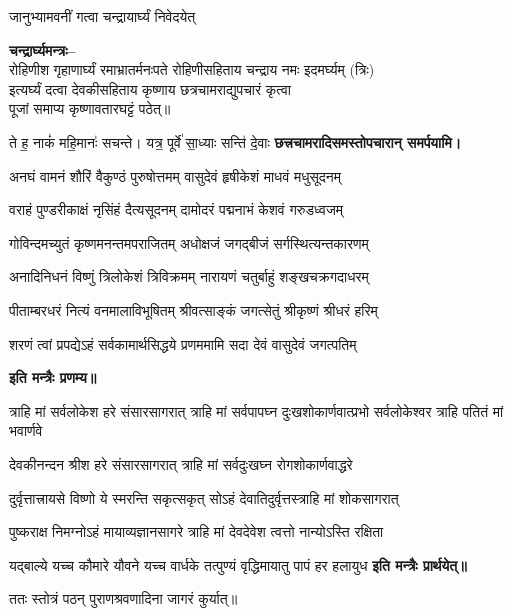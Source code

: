 \begin{center}
{जानुभ्यामवनीं गत्वा चन्द्रायार्घ्यं निवेदयेत्}

\textbf{चन्द्रार्घ्यमन्त्रः–}\\
{रोहिणीश गृहाणार्घ्यं रमाभ्रातर्मनःपते}
रोहिणीसहिताय चन्द्राय नमः इदमर्घ्यम् (त्रिः)\\

इत्यर्घ्यं दत्वा देवकीसहिताय कृष्णाय छत्रचामराद्युपचारं कृत्वा\\पूजां समाप्य कृष्णावतारघट्टं पठेत्॥

{ते ह॒ नाकं॑ महि॒मानः॑ सचन्ते। यत्र॒ पूर्वे॑ सा॒ध्याः सन्ति॑ दे॒वाः}
\textbf{\devAya{} छत्त्रचामरादिसमस्तोपचारान् समर्पयामि।}
\medskip

\twolineshloka
{अनघं वामनं शौरिं वैकुण्ठं पुरुषोत्तमम्}
{वासुदेवं हृषीकेशं माधवं मधुसूदनम्}

\twolineshloka
{वराहं पुण्डरीकाक्षं नृसिंहं दैत्यसूदनम्}
{दामोदरं पद्मनाभं केशवं गरुडध्वजम्}

\twolineshloka
{गोविन्दमच्युतं कृष्णमनन्तमपराजितम्}
{अधोक्षजं जगद्बीजं सर्गस्थित्यन्तकारणम्}

\twolineshloka
{अनादिनिधनं विष्णुं त्रिलोकेशं त्रिविक्रमम्}
{नारायणं चतुर्बाहुं शङ्खचक्रगदाधरम्}

\twolineshloka
{पीताम्बरधरं नित्यं वनमालाविभूषितम्}
{श्रीवत्साङ्कं जगत्सेतुं श्रीकृष्णं श्रीधरं हरिम्}

\twolineshloka
{शरणं त्वां प्रपद्येऽहं सर्वकामार्थसिद्धये}
{प्रणममामि सदा देवं वासुदेवं जगत्पतिम्}

\textbf{इति मन्त्रैः प्रणम्य॥}


\resetShloka
\threelineshloka
{त्राहि मां सर्वलोकेश हरे संसारसागरात्}
{त्राहि मां सर्वपापघ्न दुःखशोकार्णवात्प्रभो}
{सर्वलोकेश्वर त्राहि पतितं मां भवार्णवे}

\twolineshloka
{देवकीनन्दन श्रीश हरे संसारसागरात्}
{त्राहि मां सर्वदुःखघ्न रोगशोकार्णवाद्धरे}

\twolineshloka
{दुर्वृत्तात्त्रायसे विष्णो ये स्मरन्ति सकृत्सकृत्}
{सोऽहं देवातिदुर्वृत्तस्त्राहि मां शोकसागरात्}

\twolineshloka
{पुष्कराक्ष निमग्नोऽहं मायाव्यज्ञानसागरे}
{त्राहि मां देवदेवेश त्वत्तो नान्योऽस्ति रक्षिता}

\twolineshloka
{यद्बाल्ये यच्च कौमारे यौवने यच्च वार्धके}
{तत्पुण्यं वृद्धिमायातु पापं हर हलायुध}
\textbf{इति मन्त्रैः प्रार्थयेत्॥}

ततः स्तोत्रं पठन् पुराणश्रवणादिना जागरं कुर्यात्॥


\end{center}
